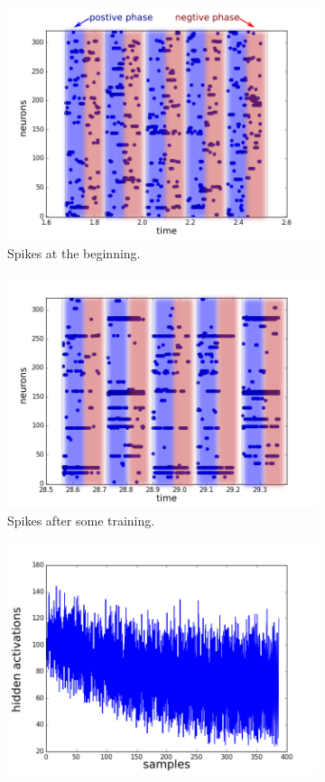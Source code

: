 \begin{figure}[h!]
	\centering
	\begin{subfigure}[t]{.32\textwidth}
  		\centering
  		\includegraphics[width=.9\linewidth]{imgs/reconst/00030_h.png}
  		\caption{Spikes at the beginning.}
  		\label{fig:sub1}
	\end{subfigure}%
	\begin{subfigure}[t]{.32\textwidth}
  		\centering
  		\includegraphics[width=.9\linewidth]{imgs/reconst/00975_h.png}
  		\caption{Spikes after some training.}
  		\label{fig:sub2}
	\end{subfigure}
	\begin{subfigure}[t]{.32\textwidth}
  		\centering
  		\includegraphics[width=.9\linewidth]{imgs/reconst/hact.png}

\end{subfigure}
\end{figure}
